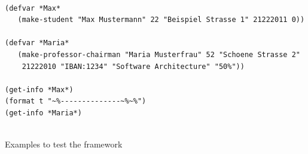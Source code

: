 \documentclass[oribibl]{llncs}
\begin{document}
\begin{listing}[]%
\begin{verbatim}

(defvar *Max* 
   (make-student "Max Mustermann" 22 "Beispiel Strasse 1" 21222011 0))

(defvar *Maria* 
   (make-professor-chairman "Maria Musterfrau" 52 "Schoene Strasse 2" 
    21222010 "IBAN:1234" "Software Architecture" "50%"))

(get-info *Max*)
(format t "~%--------------~%~%")
(get-info *Maria*)


\end{verbatim}
\caption{Examples to test the framework}
\label{lst:examples}
\end{listing}
\end{document}
